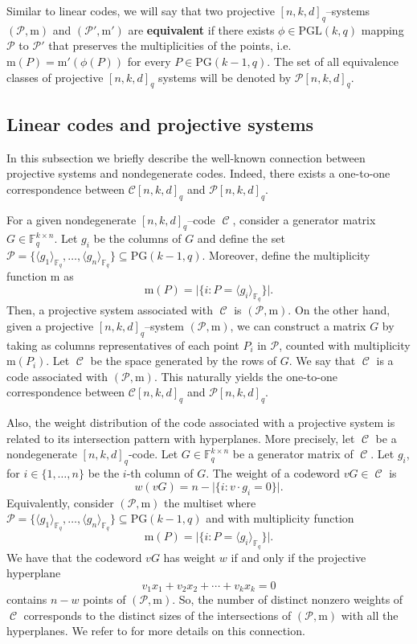 \documentclass[11pt]{amsart}
\DeclareMathOperator{\C}{\mathcal{C}}
\newcommand{\F}{{\mathbb F}}
\newcommand{\fq}{{\mathbb F}_{q}}
\newcommand{\PG}{\mathrm{PG}}
\newcommand{\classcode}{\mathcal{C}[n,k,d]_q}
\newcommand{\classsystem}{\mathcal{P}[n,k,d]_q}
\begin{document}
Similar to linear codes, we will say that two projective $[n,k,d]_q$--systems $(\mathcal{P},\mathrm{m})$ and $(\mathcal{P}',\mathrm{m}')$  are \textbf{equivalent} if there exists $\phi \in \mathrm{PGL}(k,q)$ mapping $\mathcal{P}$ to $\mathcal{P}'$ that preserves the multiplicities of the points, i.e.
$\mathrm{m}(P)=\mathrm{m}'(\phi(P))$ for every $P \in \PG(k-1,q)$. The set of all equivalence classes of projective $[n,k,d]_q$ systems will be denoted by $\mathcal{P}[n,k,d]_q$.

\subsection{Linear codes and projective systems}\label{sec:projsystlincod}

In this subsection we briefly describe the well-known connection between projective systems and nondegenerate codes.
Indeed, there exists a one-to-one correspondence between $\classcode$ and $\classsystem$. 

For a given nondegenerate $[n,k,d]_q$--code $\C$, consider a generator matrix $G \in \F_{q}^{k \times n}$. Let $g_i$ be the columns of $G$ and define the set $\mathcal{P}=\{\langle g_1\rangle_{\fq},\ldots,\langle g_n\rangle_{\fq}\} \subseteq \PG(k-1,q)$. Moreover, define the multiplicity function $\mathrm{m}$ as
\[
\mathrm{m}(P)=\lvert \{i: P=\langle g_i\rangle_{\fq}\} \rvert.
\]
Then, a projective system associated with $\C$ is $(\mathcal{P},\mathrm{m})$. 
On the other hand, given a projective $[n,k,d]_q$--system $(\mathcal{P},\mathrm{m})$, we can construct a matrix $G$ by taking as columns representatives of each point $P_i$ in $\mathcal{P}$, counted with multiplicity $\mathrm{m}(P_i)$. Let $\C$ be the space generated by the rows of $G$. We say that $\C$ is a code associated with $(\mathcal{P},\mathrm{m})$. 
This naturally yields the one-to-one correspondence between $\classcode$ and $\classsystem$.

Also, the weight distribution of the code associated with a projective system is related to its intersection pattern with hyperplanes. More precisely, let $\C$ be a nondegenerate $[n,k,d]_q$-code. Let $G \in \F_q^{k \times n}$ be a generator matrix of $\C$. Let $g_i$, for $i\in \{1,\ldots,n\}$ be the $i$-th column of $G$. The weight of a codeword $vG \in \C$ is
\[
w(vG)=n-\lvert \{i:v \cdot g_i =0\} \rvert .
\]
Equivalently, consider $(\mathcal{P},\mathrm{m})$ the multiset where $\mathcal{P}=\{\langle g_1\rangle_{\fq},\ldots,\langle g_n\rangle_{\fq}\} \subseteq \PG(k-1,q)$ and with multiplicity function
\[
\mathrm{m}(P)=\lvert \{i: P=\langle g_i\rangle_{\fq}\} \rvert.
\]
We have that the codeword $vG$ has weight $w$ if and only if
the projective hyperplane
\[v_1x_1 +v_2x_2 + \cdots + v_kx_k = 0\]
contains $n  - w$ points of $(\mathcal P, \mathrm{m})$.
So, the number of distinct nonzero weights of $\C$ corresponds to the distinct sizes of the intersections of $({\mathcal P},\mathrm{m})$ with all the hyperplanes.
We refer to \cite{vladut2007algebraic} for more details on this connection.
\end{document}
